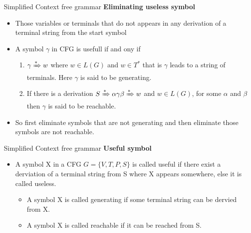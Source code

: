 \documentclass{beamer}
\begin{document}
\begin{frame}{Simplified Context free grammar}
	\textbf{Eliminating useless symbol}
	\begin{itemize}
		\item Those variables or terminals that do not appears in any derivation of a terminal string from the start symbol
		\item A symbol $\gamma$ in CFG is usefull if and ony if 
		\begin{enumerate}
			\item $\gamma \xRightarrow{*}w$ where $w\in L(G)$ and $w\in T^*$ that is $\gamma$ leads to a string of terminals.
			 Here $\gamma$ is said to be generating.
			 \item If there is a derivation $S\xRightarrow{*} \alpha \gamma \beta \xRightarrow{*} w$ and $w \in L(G)$, for some $\alpha$ and $\beta$ then $\gamma$ is said to be reachable. 
	 		\end{enumerate}
 		\item So first eliminate symbols that are not generating and then eliminate  those symbols are not reachable.
	\end{itemize}
\end{frame}

\begin{frame}{Simplified Context free grammar}
	\textbf{Useful symbol}
	\begin{itemize}
		\item A symbol X in a CFG $G = \{V, T, P, S\}$ is called useful if there exist a
		derviation of a terminal string from S where X appears somewhere, else it is
		called useless.
		\begin{itemize}
			\item A symbol X is called generating if some terminal string can be dervied from	X.
			\item  A symbol X is called reachable if it can be reached from S.

		\end{itemize}
	\end{itemize}
\end{frame}
\end{document}
